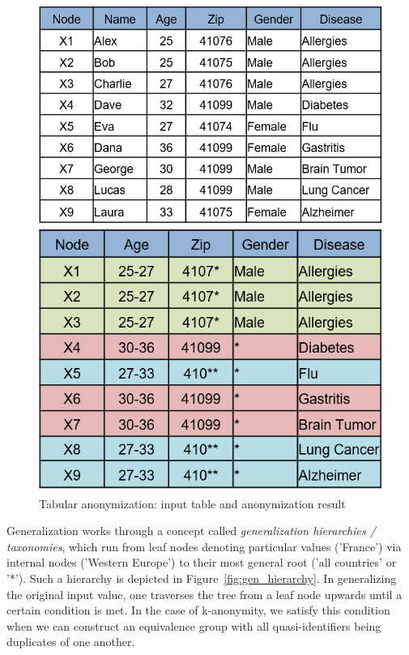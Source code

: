 \documentclass{llncs}
\begin{document}
\begin{figure}[h]
	\centering
	\begin{minipage}[b]{0.535\textwidth}
		\includegraphics[width=\textwidth]{figures/theory/k_anon_input}
	\end{minipage}
	\hfill
	\begin{minipage}[b]{0.448\textwidth}
		\includegraphics[width=\textwidth]{figures/theory/k_anon_output}
	\end{minipage}
	\caption{Tabular anonymization: input table and anonymization result}
	\label{fig:anonymized_clusters}
\end{figure}

Generalization works through a concept called \textit{generalization hierarchies / taxonomies}, which run from leaf nodes denoting particular values ('France') via internal nodes ('Western Europe') to their most general root ('all countries' or '*'). Such a hierarchy is depicted in Figure~\ref{fig:gen_hierarchy}. In generalizing the original input value, one traverses the tree from a leaf node upwards until a certain condition is met. In the case of k-anonymity, we satisfy this condition when we can construct an equivalence group with all quasi-identifiers being duplicates of one another.
\end{document}
